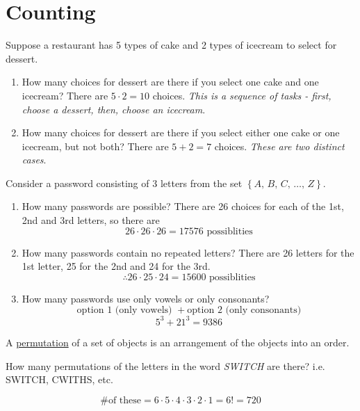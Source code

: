 \section{Counting}
\begin{example}
    Suppose a restaurant has 5 types of cake and 2 types of icecream to select for dessert.
    \begin{enumerate}
        \item How many choices for dessert are there if you select one cake and one icecream?
        There are $5\cdot 2 = 10$ choices. \emph{This is a sequence of tasks - first, choose a dessert, then, choose an icecream}.
        \item How many choices for dessert are there if you select either one cake or one icecream, but not both?
        There are $5 + 2 = 7$ choices. \emph{These are two distinct cases}.
    \end{enumerate}
\end{example}

\begin{example}
    Consider a password consisting of 3 letters from the set $\left\{A,\,B,\,C,\,\dots,\,Z\right\}$.
    \begin{enumerate}
        \item How many passwords are possible?
        There are 26 choices for each of the 1st, 2nd and 3rd letters, so there are $$26\cdot 26\cdot 26 = 17576 \text{ possiblities}$$
        \item How many passwords contain no repeated letters?
        There are 26 letters for the 1st letter, 25 for the 2nd and 24 for the 3rd.
        $$\therefore 26\cdot 25\cdot 24 = 15600 \text{ possiblities}$$
        \item How many passwords use only vowels or only consonants?
        $$\text{option } 1 \text{ (only vowels) } + \text{option } 2\text{ (only consonants)}$$
        $$5^3 + 21^3 = 9386$$
    \end{enumerate}
\end{example}

\begin{definition}
    A \underline{permutation} of a set of objects is an arrangement of the objects into an order.
\end{definition}

\begin{example}
    How many permutations of the letters in the word \emph{SWITCH} are there? i.e. SWITCH, CWITHS, etc.

    $$\text{\# of these} = 6\cdot 5\cdot 4\cdot 3\cdot 2\cdot 1 = 6! = 720$$
\end{example}

